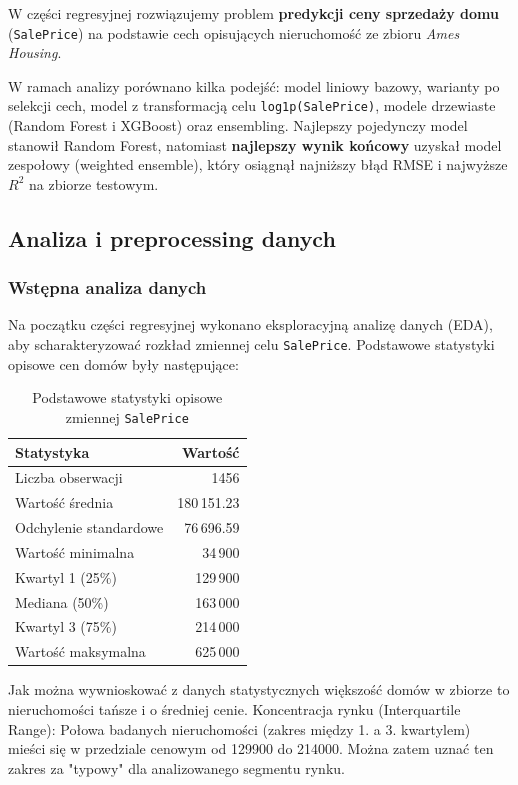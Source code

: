 \documentclass[12pt, a4paper]{article}
\begin{document}
W części regresyjnej rozwiązujemy problem \textbf{predykcji ceny sprzedaży domu} (\texttt{SalePrice}) na podstawie cech opisujących nieruchomość ze zbioru \textit{Ames Housing}. 

W ramach analizy porównano kilka podejść: model liniowy bazowy, warianty po selekcji cech, model z transformacją celu \texttt{log1p(SalePrice)}, modele drzewiaste (Random Forest i XGBoost) oraz ensembling. Najlepszy pojedynczy model stanowił Random Forest, natomiast \textbf{najlepszy wynik końcowy} uzyskał model zespołowy (weighted ensemble), który osiągnął najniższy błąd RMSE i najwyższe $R^2$ na zbiorze testowym.
\subsection{Analiza i preprocessing danych}

\subsubsection{Wstępna analiza danych}

Na początku części regresyjnej wykonano eksploracyjną analizę danych (EDA), aby scharakteryzować rozkład zmiennej celu \texttt{SalePrice}. Podstawowe statystyki opisowe cen domów były następujące:
\begin{table}[H]
\centering
\begin{tabular}{|l|r|}
\hline
\textbf{Statystyka} & \textbf{Wartość} \\ \hline
Liczba obserwacji & 1456 \\ \hline
Wartość średnia & 180\,151.23 \\ \hline
Odchylenie standardowe & 76\,696.59 \\ \hline
Wartość minimalna & 34\,900 \\ \hline
Kwartyl 1 (25\%) & 129\,900 \\ \hline
Mediana (50\%) & 163\,000 \\ \hline
Kwartyl 3 (75\%) & 214\,000 \\ \hline
Wartość maksymalna & 625\,000 \\ \hline
\end{tabular}
\caption{Podstawowe statystyki opisowe zmiennej \texttt{SalePrice}}
\label{tab:saleprice-stats}
\end{table}

Jak można wywnioskować z danych statystycznych większość domów w zbiorze to nieruchomości tańsze i o średniej cenie. Koncentracja rynku (Interquartile Range): Połowa badanych nieruchomości (zakres między 1. a 3. kwartylem) mieści się w przedziale cenowym od 129900 do 214000. Można zatem uznać ten zakres za "typowy" dla analizowanego segmentu rynku.
\end{document}
